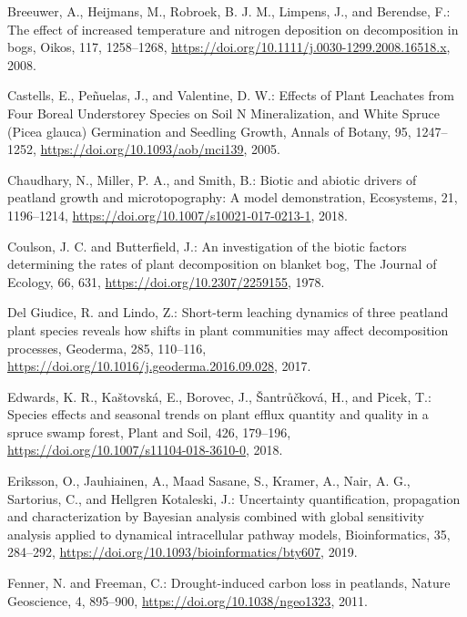 \documentclass[
  12pt,
]{article}
\newlength{\cslhangindent}
\newlength{\cslentryspacingunit} %
\newenvironment{CSLReferences}[2] %
 {%
  \setlength{\parindent}{0pt}
  \ifodd #1
  \let\oldpar\par
  \def\par{\hangindent=\cslhangindent\oldpar}
  \fi
  \setlength{\parskip}{#2\cslentryspacingunit}
 }%
 {}
\begin{document}
\begin{CSLReferences}{0}{0}
\leavevmode{}%
Breeuwer, A., Heijmans, M., Robroek, B. J. M., Limpens, J., and Berendse, F.: The effect of increased temperature and nitrogen deposition on decomposition in bogs, Oikos, 117, 1258--1268, \url{https://doi.org/10.1111/j.0030-1299.2008.16518.x}, 2008.

\leavevmode{}%
Castells, E., Peñuelas, J., and Valentine, D. W.: Effects of {Plant Leachates} from {Four Boreal Understorey Species} on {Soil N Mineralization}, and {White Spruce} ({Picea} glauca) {Germination} and {Seedling Growth}, Annals of Botany, 95, 1247--1252, \url{https://doi.org/10.1093/aob/mci139}, 2005.

\leavevmode{}%
Chaudhary, N., Miller, P. A., and Smith, B.: Biotic and abiotic drivers of peatland growth and microtopography: {A} model demonstration, Ecosystems, 21, 1196--1214, \url{https://doi.org/10.1007/s10021-017-0213-1}, 2018.

\leavevmode{}%
Coulson, J. C. and Butterfield, J.: An investigation of the biotic factors determining the rates of plant decomposition on blanket bog, The Journal of Ecology, 66, 631, \url{https://doi.org/10.2307/2259155}, 1978.

\leavevmode{}%
Del Giudice, R. and Lindo, Z.: Short-term leaching dynamics of three peatland plant species reveals how shifts in plant communities may affect decomposition processes, Geoderma, 285, 110--116, \url{https://doi.org/10.1016/j.geoderma.2016.09.028}, 2017.

\leavevmode{}%
Edwards, K. R., Kaštovská, E., Borovec, J., Šantrůčková, H., and Picek, T.: Species effects and seasonal trends on plant efflux quantity and quality in a spruce swamp forest, Plant and Soil, 426, 179--196, \url{https://doi.org/10.1007/s11104-018-3610-0}, 2018.

\leavevmode{}%
Eriksson, O., Jauhiainen, A., Maad Sasane, S., Kramer, A., Nair, A. G., Sartorius, C., and Hellgren Kotaleski, J.: Uncertainty quantification, propagation and characterization by {Bayesian} analysis combined with global sensitivity analysis applied to dynamical intracellular pathway models, Bioinformatics, 35, 284--292, \url{https://doi.org/10.1093/bioinformatics/bty607}, 2019.

\leavevmode{}%
Fenner, N. and Freeman, C.: Drought-induced carbon loss in peatlands, Nature Geoscience, 4, 895--900, \url{https://doi.org/10.1038/ngeo1323}, 2011.


\end{CSLReferences}
\end{document}
